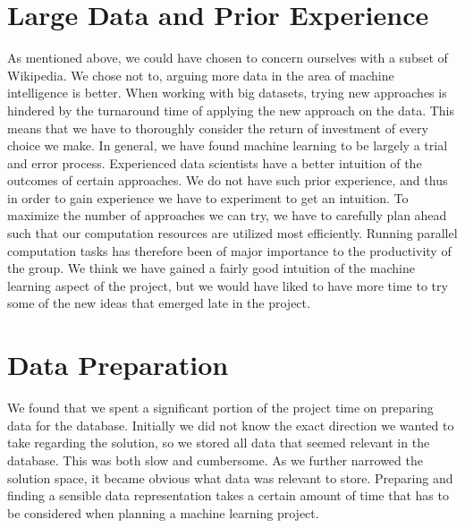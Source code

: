 \section{Large Data and Prior Experience}
As mentioned above, we could have chosen to concern ourselves with a subset of Wikipedia. We chose not to, arguing more data in the area of machine intelligence is better. When working with big datasets, trying new approaches is hindered by the turnaround time of applying the new approach on the data. This means that we have to thoroughly consider the return of investment of every choice we make. In general, we have found machine learning to be largely a trial and error process. Experienced data scientists have a better intuition of the outcomes of certain approaches. We do not have such prior experience, and thus in order to gain experience we have to experiment to get an intuition. To maximize the number of approaches we can try, we have to carefully plan ahead such that our computation resources are utilized most efficiently. Running parallel computation tasks has therefore been of major importance to the productivity of the group. We think we have gained a fairly good intuition of the machine learning aspect of the project, but we would have liked to have more time to try some of the new ideas that emerged late in the project.  

\section{Data Preparation}
We found that we spent a significant portion of the project time on preparing data for the database. Initially we did not know the exact direction we wanted to take regarding the solution, so we stored all data that seemed relevant in the database. This was both slow and cumbersome. As we further narrowed the solution space, it became obvious what data was relevant to store. Preparing and finding a sensible data representation takes a certain amount of time that has to be considered when planning a machine learning project.

